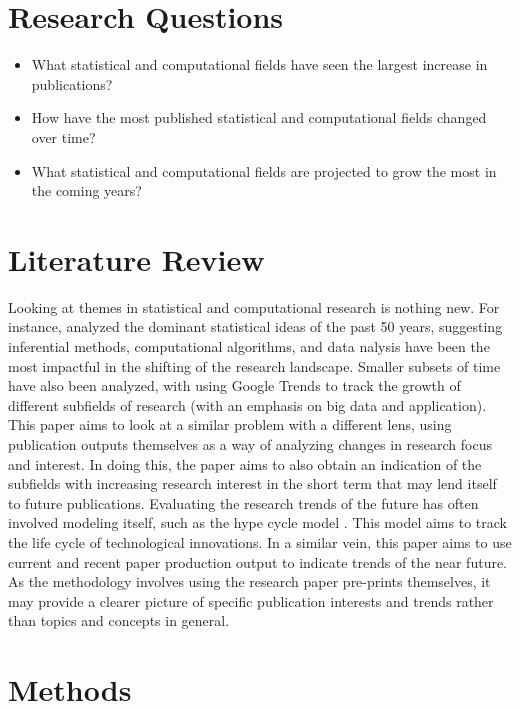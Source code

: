 \documentclass[
  12pt]{article}
\providecommand{\tightlist}{%
  \setlength{\itemsep}{0pt}\setlength{\parskip}{0pt}}\usepackage{longtable,booktabs,array}
\begin{document}
\section{Research Questions}\label{sec-questions}

\begin{itemize}
\tightlist
\item
  What statistical and computational fields have seen the largest
  increase in publications?
\item
  How have the most published statistical and computational fields
  changed over time?
\item
  What statistical and computational fields are projected to grow the
  most in the coming years?
\end{itemize}

\section{Literature Review}\label{lit-review}

Looking at themes in statistical and computational research is nothing
new. For instance, \citet{gelm:veht:2021} analyzed the dominant
statistical ideas of the past 50 years, suggesting inferential methods,
computational algorithms, and data nalysis have been the most impactful
in the shifting of the research landscape. Smaller subsets of time have
also been analyzed, with \citet{jun:yoo:choi:2018} using Google Trends
to track the growth of different subfields of research (with an emphasis
on big data and application). This paper aims to look at a similar
problem with a different lens, using publication outputs themselves as a
way of analyzing changes in research focus and interest. In doing this,
the paper aims to also obtain an indication of the subfields with
increasing research interest in the short term that may lend itself to
future publications. Evaluating the research trends of the future has
often involved modeling itself, such as the hype cycle model
\citet{dedehayir:2016}. This model aims to track the life cycle of
technological innovations. In a similar vein, this paper aims to use
current and recent paper production output to indicate trends of the
near future. As the methodology involves using the research paper
pre-prints themselves, it may provide a clearer picture of specific
publication interests and trends rather than topics and concepts in
general.

\section{Methods}\label{sec-meth}
\end{document}
